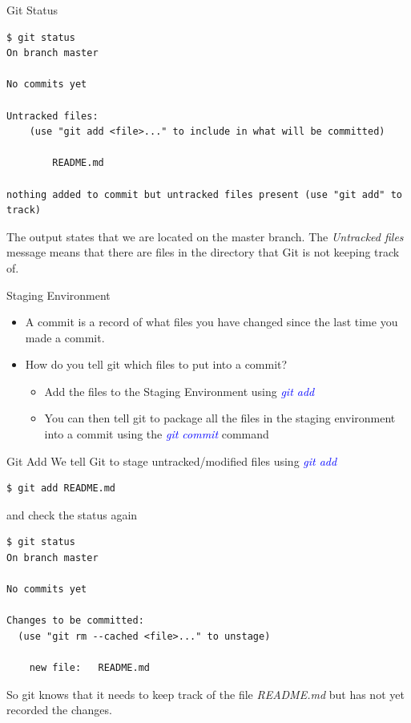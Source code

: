 \documentclass[11pt]{beamer}
\begin{document}
\begin{frame}[fragile]{Git Status}

\begin{lstlisting}
$ git status
On branch master

No commits yet

Untracked files:
	(use "git add <file>..." to include in what will be committed)

		README.md

nothing added to commit but untracked files present (use "git add" to track)
\end{lstlisting}
The output states that we are located on the master branch. The \emph{Untracked files} message means that there are files in the directory that Git is not keeping track of.
\end{frame}
\begin{frame}[fragile]{Staging Environment}
\begin{itemize}
	\item  A commit is a record of what files you have changed since the last time you made a commit.
 	\item How do you tell git which files to put into a commit?
	\begin{itemize}
		\item Add the files to the Staging Environment using \textcolor{blue}{\emph{git add}}
		\item You can then tell git to package all the files in the staging environment into a commit using the \textcolor{blue}{\emph{git commit}} command
	\end{itemize}
	
\end{itemize}
\end{frame}
\begin{frame}[fragile]{Git Add}
We tell Git to stage untracked/modified files using \textcolor{blue}{\emph{git add}}
\begin{lstlisting}
$ git add README.md
\end{lstlisting}
and check the status again
\begin{lstlisting}
$ git status
On branch master

No commits yet

Changes to be committed:
  (use "git rm --cached <file>..." to unstage)

	new file:   README.md
\end{lstlisting}

So git knows that it needs to keep track of the file \emph{README.md} but has not yet recorded the changes. 
\end{frame}
\end{document}
